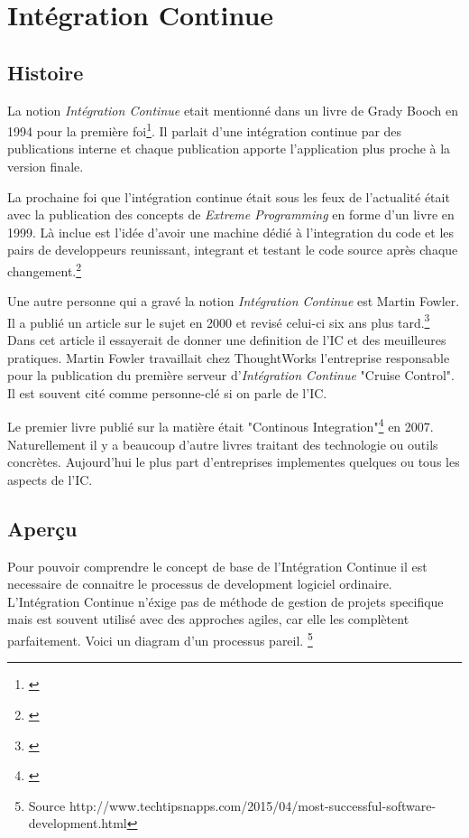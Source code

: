 \chapter{Intégration Continue}
\label{chap:integrationcontinue}

\section{Histoire}
La notion \textit{Intégration Continue} etait mentionné dans un livre de Grady Booch en 1994 pour la première foi\footnote{\cite{boochooad}}. Il parlait d'une intégration continue par des publications interne et chaque publication apporte l'application plus proche à la version finale.

La prochaine foi que l'intégration continue était sous les feux de l'actualité était avec la publication des concepts de \textit{Extreme Programming} en forme d'un livre en 1999.
Là inclue est l'idée d'avoir une machine dédié à l'integration du code et les pairs de developpeurs reunissant, integrant et testant le code source après chaque changement.\footnote{\cite{robertshistory}}

Une autre personne qui a gravé la notion \textit{Intégration Continue} est Martin Fowler. Il a publié un article sur le sujet en 2000 et revisé celui-ci six ans plus tard.\footnote{\cite{fowlerci}} Dans cet article il essayerait de donner une definition de l'IC et des meuilleures pratiques. Martin Fowler travaillait chez ThoughtWorks l'entreprise responsable pour la publication du première serveur d'\textit{Intégration Continue} "Cruise Control". Il est souvent cité comme personne-clé si on parle de l'IC.

Le premier livre publié sur la matière était "Continous Integration"\footnote{\cite{duvallconint}} en 2007. Naturellement il y a beaucoup d'autre livres traitant des technologie ou outils concrètes. Aujourd'hui le plus part d'entreprises implementes quelques ou tous les aspects de l'IC.

\nocite{wikici}
\newpage

\section{Aperçu}
Pour pouvoir comprendre le concept de base de l'Intégration Continue il est necessaire de connaitre le processus de development logiciel ordinaire. L'Intégration Continue n'éxige pas de méthode de gestion de projets specifique mais est souvent utilisé avec des approches agiles, car elle les complètent parfaitement. Voici un diagram d'un processus pareil. \footnote{Source http://www.techtipsnapps.com/2015/04/most-successful-software-development.html}

